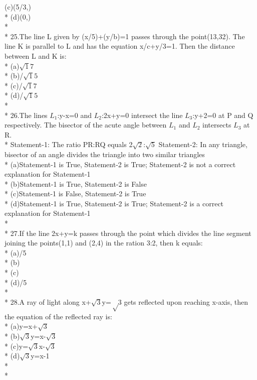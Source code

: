 \documentclass{article}
\begin{document}
{(c)\enspace (5/3,)\\*
(d)\enspace (0,)\\*\\*
25.\enspace The line L given by (x/5)+(y/b)=1 \enspace passes through the point(13,32). The line K is parallel to L and has the equation x/c+y/3=1. Then the distance between L and K is:\\*
(a)\enspace $\sqrt17$\\*
(b)/$\sqrt15$\\*
(c)/$\sqrt17$\\*
(d)/$\sqrt15$\\*\\*
26.\enspace The lines $L_1$:\enspace y-x=0 and $L_2$:\enspace 2x+y=0 intersect the line $L_3$:y+2=0 at P and Q respectively. The bisector of the acute angle between $L_1$ and $L_2$ intersects $L_3$ at R.\\*
Statement-1: The ratio PR:RQ equals 2$\sqrt2$:$\sqrt5$
Statement-2: In any triangle, bisector of an angle divides the triangle into two similar triangles\\*
(a)\enspace Statement-1 is True, Statement-2 is True; Statement-2 is not a correct explanation for Statement-1\\*
(b)\enspace Statement-1 is True, Statement-2 is False\\*
(c)\enspace Statement-1 is False, Statement-2 is True\\*
(d)\enspace Statement-1 is True, Statement-2 is True; Statement-2 is a correct explanation for Statement-1\\*\\*
27.\enspace If the line 2x+y=k passes through the point which divides the line segment joining the points(1,1) and (2,4) in the ration 3:2, then k equals:\\*
(a)/5 \\*
(b)\\*
(c)\\*
(d)/5\\*\\*
28.\enspace A ray of light along x+$\sqrt3$y=$\sqrt$3 gets reflected upon reaching x-axis, then the equation of the reflected ray is:\\*
(a)\enspace y=x+$\sqrt3$\\*
(b)\enspace $\sqrt3$y=x-$\sqrt3$\\*
(c)\enspace y=$\sqrt3$x-$\sqrt3$\\*
(d)\enspace $\sqrt3$y=x-1\\*\\*
}
\end{document}
